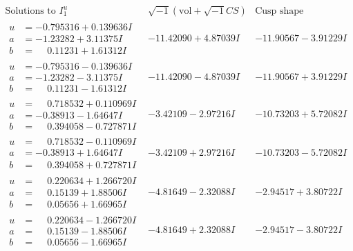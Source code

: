 \documentclass[1p]{elsarticle_modified}
\theoremstyle{definition}
\newcommand{\I}{\sqrt{-1}}
\begin{document}
$$\begin{array}{c|c|c}  
\text{Solutions to }I^u_{1}& \I (\text{vol} + \sqrt{-1}CS) & \text{Cusp shape}\\
 \hline 
\begin{aligned}
u &= -0.795316 + 0.139636 I \\
a &= -1.23282 + 3.11375 I \\
b &= \phantom{-}0.11231 + 1.61312 I\end{aligned}
 & -11.42090 + 4.87039 I & -11.90567 - 3.91229 I \\ \hline\begin{aligned}
u &= -0.795316 - 0.139636 I \\
a &= -1.23282 - 3.11375 I \\
b &= \phantom{-}0.11231 - 1.61312 I\end{aligned}
 & -11.42090 - 4.87039 I & -11.90567 + 3.91229 I \\ \hline\begin{aligned}
u &= \phantom{-}0.718532 + 0.110969 I \\
a &= -0.38913 - 1.64647 I \\
b &= \phantom{-}0.394058 - 0.727871 I\end{aligned}
 & -3.42109 - 2.97216 I & -10.73203 + 5.72082 I \\ \hline\begin{aligned}
u &= \phantom{-}0.718532 - 0.110969 I \\
a &= -0.38913 + 1.64647 I \\
b &= \phantom{-}0.394058 + 0.727871 I\end{aligned}
 & -3.42109 + 2.97216 I & -10.73203 - 5.72082 I \\ \hline\begin{aligned}
u &= \phantom{-}0.220634 + 1.266720 I \\
a &= \phantom{-}0.15139 + 1.88506 I \\
b &= \phantom{-}0.05656 + 1.66965 I\end{aligned}
 & -4.81649 - 2.32088 I & -2.94517 + 3.80722 I \\ \hline\begin{aligned}
u &= \phantom{-}0.220634 - 1.266720 I \\
a &= \phantom{-}0.15139 - 1.88506 I \\
b &= \phantom{-}0.05656 - 1.66965 I\end{aligned}
 & -4.81649 + 2.32088 I & -2.94517 - 3.80722 I \\ \hline\begin{aligned}

\end{aligned}
\end{array}$$
\end{document}
